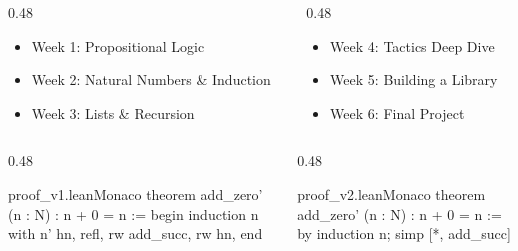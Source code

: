 \documentclass{retrobeamer}
\begin{document}
\begin{frame}[fragile,t]
  \vspace{0.2cm}
  \begin{columns}[T]
    \begin{column}{0.48\textwidth}
      \begin{itemize}
        \item \Large Week 1: Propositional Logic
        \item \Large Week 2: Natural Numbers \& Induction
        \item \Large Week 3: Lists \& Recursion
      \end{itemize}
    \end{column}
    \begin{column}{0.48\textwidth}
      \begin{itemize}
        \item \Large Week 4: Tactics Deep Dive
        \item \Large Week 5: Building a Library
        \item \Large Week 6: Final Project
      \end{itemize}
    \end{column}
  \end{columns}
\end{frame}

\begin{frame}[fragile,t]
  \begin{columns}[T]
    \begin{column}{0.48\textwidth}
      \\[2pt]
\begin{macwindow}{proof\_v1.lean}{Monaco}
theorem add_zero'
  (n : N) : n + 0 = n :=
begin
  induction n with n' hn,
    refl,
    rw add_succ,
    rw hn,
end
\end{macwindow}
    \end{column}
    \begin{column}{0.48\textwidth}
      \\[2pt]
\begin{macwindow}{proof\_v2.lean}{Monaco}
theorem add_zero'
  (n : N) : n + 0 = n :=
by induction n;
   simp [*, add_succ]
\end{macwindow}
    \end{column}
  \end{columns}
\end{frame}
\end{document}
